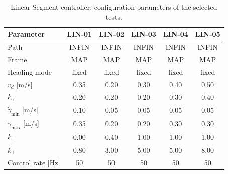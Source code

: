   \begin{table}[H]
  \centering
  \caption{Linear Segment controller: configuration parameters of the selected tests.}
  \label{tab:linear_configuration_parameters}
  \small
  \begin{tabular}{lccccc}
  \toprule
  \textbf{Parameter} &
  \textbf{LIN-01} &
  \textbf{LIN-02} &
  \textbf{LIN-03} &
  \textbf{LIN-04} &
  \textbf{LIN-05} \\
  \midrule
  Path & INFIN & INFIN & INFIN & INFIN & INFIN \\
  Frame & MAP & MAP & MAP & MAP & MAP \\
  Heading mode & fixed & fixed & fixed & fixed & fixed \\
  \(v_d\) [m/s] & 0.35 & 0.20 & 0.30 & 0.40 & 0.50 \\
  \(k_{\gamma}\) & 0.20 & 0.20 & 0.20 & 0.30 & 0.40 \\
  \(\dot{\gamma}_{\min}\) [m/s] & 0.10 & 0.05 & 0.05 & 0.05 & 0.05 \\
  \(\dot{\gamma}_{\max}\) [m/s] & 0.35 & 0.20 & 0.20 & 0.30 & 0.30 \\
  \(k_{\parallel}\) & 0.00 & 0.40 & 1.00 & 1.00 & 1.00 \\
  \(k_{\perp}\) & 0.80 & 3.00 & 5.00 & 5.00 & 8.00 \\
  Control rate [Hz] & 50 & 50 & 50 & 50 & 50 \\
  \bottomrule
  \end{tabular}
  \end{table}

